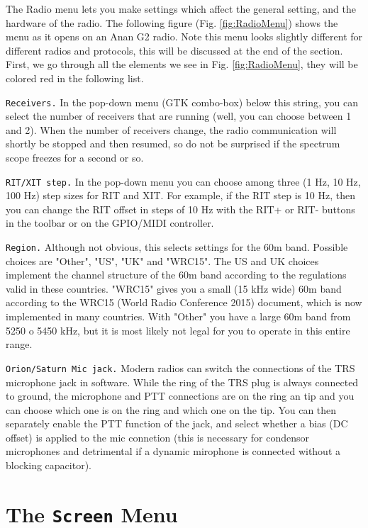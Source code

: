 \documentclass[12pt]{book}
\def\rett#1{\texttt{\color{red}#1}}
\begin{document}
The Radio menu lets you make settings which affect the general setting, and the hardware of the radio.
The following figure (Fig. \ref{fig:RadioMenu}) shows the menu as it opens on an Anan G2 radio.
Note this menu looks slightly different for different radios and protocols, this will be discussed
at the end of the section. First, we go through all the elements we see in Fig. \ref{fig:RadioMenu},
they will be colored red in the following list.

\rett{Receivers.} In the pop-down menu (GTK combo-box) below this string, you can select the number
of receivers that are running (well, you can choose between 1 and 2). When the number of receivers change,
the radio communication will shortly be stopped and then resumed, so do not be surprised if the spectrum
scope freezes for a second or so.

\rett{RIT/XIT step.} In the pop-down menu you can choose among three (1 Hz, 10 Hz, 100 Hz) step sizes
for RIT and XIT. For example, if the RIT step is 10 Hz, then you can change the RIT offset in steps of
10 Hz with the RIT+ or RIT- buttons in the toolbar or on the GPIO/MIDI controller.

\rett{Region.} Although not obvious, this selects settings for the 60m band. Possible choices are "Other",
"US", "UK" and "WRC15". The US and UK choices implement the channel structure of the 60m band according
to the regulations valid in these countries. "WRC15" gives you a small (15 kHz wide) 60m band according to the WRC15
(World Radio Conference 2015) document, which is now implemented in many countries. With "Other" you
have a large 60m band from 5250 o 5450 kHz, but it is most likely not legal for you to operate in this
entire range.

\rett{Orion/Saturn Mic jack.} Modern radios can switch the connections of the TRS microphone jack in software.
While the ring of the TRS plug is always connected to ground, the microphone and PTT connections are on the
ring an tip and you can choose which one is on the ring and which one on the tip. You can then separately
enable the PTT function of the jack, and select whether a bias (DC offset) is applied to the mic connetion
(this is necessary for condensor microphones and detrimental if a dynamic mirophone is connected without
a blocking capacitor).

\section{The \texttt{Screen} Menu}
\end{document}
